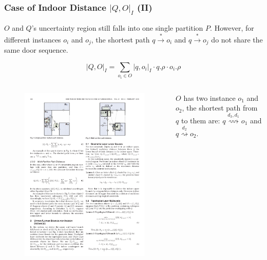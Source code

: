 \begin{frame}
\frametitle{Case of Indoor Distance $|Q, O|_I$ (II)}

 \quad $O$ and $Q$'s uncertainty region still falls into one single partition $P$. However, for different instances $o_i$ and $o_j$, the shortest path $q \overset{*}{\rightarrow} o_i$ and $q \overset{*}{\rightarrow} o_j$ do not share the same door sequence.

\begin{equation}
  |Q, O|_{I} = \sum_{o_i \in O}|q, o_i|_I \cdot q.\rho \cdot o_i.\rho
\end{equation}

\begin{columns}[c]

  \begin{figure}[tb]
    \includegraphics[width=\columnwidth]{figures/2-7/2-7-2.pdf}
  \end{figure}

  \begin{example}
    $O$ has two instance $o_1$ and $o_2$, the shortest path from $q$ to them are: $q \overset{d_3, d_1}{\rightsquigarrow} o_1$ and $q \overset{d_2}{\rightsquigarrow} o_2$.
  \end{example}

\end{columns}

\end{frame}


